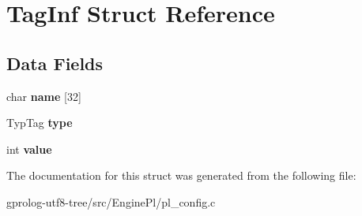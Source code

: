\hypertarget{structTagInf}{}\section{Tag\+Inf Struct Reference}
\label{structTagInf}
\subsection*{Data Fields}
\begin{DoxyCompactItemize}
\item 
char {\bfseries name} \mbox{[}32\mbox{]}\hypertarget{structTagInf_a6dc0e60ac19532e7c8e1c30f73357c1c}{}\label{structTagInf_a6dc0e60ac19532e7c8e1c30f73357c1c}

\item 
Typ\+Tag {\bfseries type}\hypertarget{structTagInf_a1d109a0184537c9f448e28aa6c492b91}{}\label{structTagInf_a1d109a0184537c9f448e28aa6c492b91}

\item 
int {\bfseries value}\hypertarget{structTagInf_ae5a47ca79c53423fd961942af0647109}{}\label{structTagInf_ae5a47ca79c53423fd961942af0647109}

\end{DoxyCompactItemize}


The documentation for this struct was generated from the following file\+:\begin{DoxyCompactItemize}
\item 
gprolog-\/utf8-\/tree/src/\+Engine\+Pl/pl\+\_\+config.\+c\end{DoxyCompactItemize}
